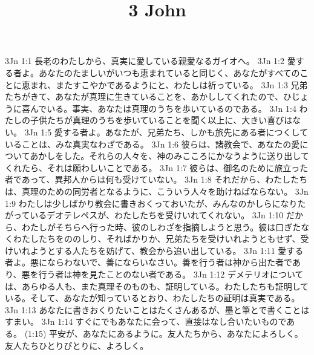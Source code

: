 

\title{3 John}

3Jn 1:1  長老のわたしから、真実に愛している親愛なるガイオへ。
3Jn 1:2  愛する者よ。あなたのたましいがいつも恵まれていると同じく、あなたがすべてのことに恵まれ、またすこやかであるようにと、わたしは祈っている。
3Jn 1:3  兄弟たちがきて、あなたが真理に生きていることを、あかししてくれたので、ひじょうに喜んでいる。事実、あなたは真理のうちを歩いているのである。
3Jn 1:4  わたしの子供たちが真理のうちを歩いていることを聞く以上に、大きい喜びはない。
3Jn 1:5  愛する者よ。あなたが、兄弟たち、しかも旅先にある者につくしていることは、みな真実なわざである。
3Jn 1:6  彼らは、諸教会で、あなたの愛についてあかしをした。それらの人々を、神のみこころにかなうように送り出してくれたら、それは願わしいことである。
3Jn 1:7  彼らは、御名のために旅立った者であって、異邦人からは何も受けていない。
3Jn 1:8  それだから、わたしたちは、真理のための同労者となるように、こういう人々を助けねばならない。
3Jn 1:9  わたしは少しばかり教会に書きおくっておいたが、みんなのかしらになりたがっているデオテレペスが、わたしたちを受けいれてくれない。
3Jn 1:10  だから、わたしがそちらへ行った時、彼のしわざを指摘しようと思う。彼は口ぎたなくわたしたちをののしり、そればかりか、兄弟たちを受けいれようともせず、受けいれようとする人たちを妨げて、教会から追い出している。
3Jn 1:11  愛する者よ。悪にならわないで、善にならいなさい。善を行う者は神から出た者であり、悪を行う者は神を見たことのない者である。
3Jn 1:12  デメテリオについては、あらゆる人も、また真理そのものも、証明している。わたしたちも証明している。そして、あなたが知っているとおり、わたしたちの証明は真実である。
3Jn 1:13  あなたに書きおくりたいことはたくさんあるが、墨と筆とで書くことはすまい。
3Jn 1:14  すぐにでもあなたに会って、直接はなし合いたいものである。 (1:15) 平安が、あなたにあるように。友人たちから、あなたによろしく。友人たちひとりびとりに、よろしく。


